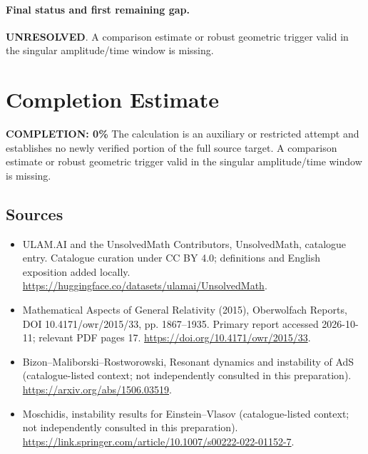 \documentclass[11pt]{article}
\begin{document}
\paragraph{Final status and first remaining gap.}
\textbf{UNRESOLVED}. A comparison estimate or robust geometric trigger valid in the singular amplitude/time window is missing.

\section{Completion Estimate}
\noindent\textbf{COMPLETION: 0\%}
The calculation is an auxiliary or restricted attempt and establishes no newly verified portion of the full source target. A comparison estimate or robust geometric trigger valid in the singular amplitude/time window is missing.

\subsection{Sources}
\begin{itemize}
\item[\hypertarget{source:statement:1}{S1}] ULAM.AI and the UnsolvedMath Contributors, UnsolvedMath, catalogue entry. Catalogue curation under CC BY 4.0; definitions and English exposition added locally.
\url{https://huggingface.co/datasets/ulamai/UnsolvedMath}.
\item[\hypertarget{source:statement:2}{S2}] Mathematical Aspects of General Relativity (2015), Oberwolfach Reports, DOI 10.4171/owr/2015/33, pp. 1867--1935. Primary report accessed 2026-10-11; relevant PDF pages 17.
\url{https://doi.org/10.4171/owr/2015/33}.
\item[\hypertarget{source:statement:3}{S3}] Bizon--Maliborski--Rostworowski, Resonant dynamics and instability of AdS (catalogue-listed context; not independently consulted in this preparation).
\url{https://arxiv.org/abs/1506.03519}.
\item[\hypertarget{source:statement:4}{S4}] Moschidis, instability results for Einstein--Vlasov (catalogue-listed context; not independently consulted in this preparation).
\url{https://link.springer.com/article/10.1007/s00222-022-01152-7}.
\end{itemize}
\label{end:statement}
\end{document}
